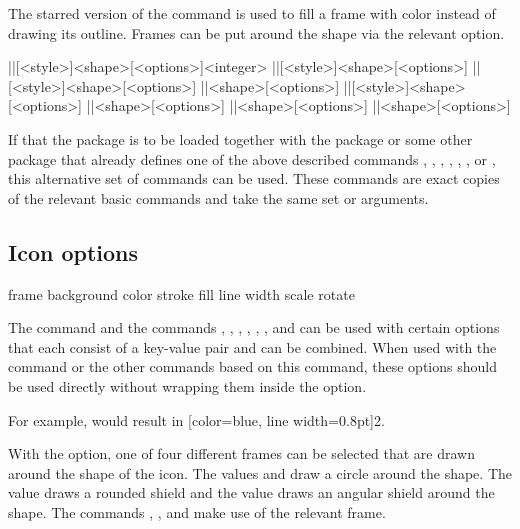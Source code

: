 \documentclass[a4paper]{article}
\begin{document}
The starred version of the command is used to fill a frame with color instead of drawing its outline. Frames can be put around the shape via the relevant  option. 

\begin{macrodef}
|\DndiconsDie|[<style>]{<shape>}[<options>]{<integer>}
|\DndiconsAbiliy|[<style>]{<shape>}[<options>]
|\DndiconsSaving|[<style>]{<shape>}[<options>]
|\DndiconsSpell|{<shape>}[<options>]
|\DndiconsSpellschool|[<style>]{<shape>}[<options>]
|\DndiconsDamage|{<shape>}[<options>]
|\DndiconsAttack|{<shape>}[<options>]
|\DndiconsCondition|{<shape>}[<options>]
\end{macrodef}
If that the  package is to be loaded together with the  package or some other package that already defines one of the above described commands \macro{\die}, \macro{\ability}, \macro{\saving}, \macro{\spell}, \macro{\spellschool}, \macro{\damage}, \macro{\attack} or \macro{\condition}, this alternative set of commands can be used. These commands are exact copies of the relevant basic commands and take the same set or arguments. 

\subsection{Icon options}

\begin{macrodef}
frame
background
color
stroke
fill
line width
scale
rotate
\end{macrodef}
The \macro{\DndIconsUseIcon} command and the commands \macro{\die}, \macro{\ability}, \macro{\saving}, \macro{\spell}, \macro{\spellschool}, \macro{\damage}, \macro{\attack} and \macro{\condition} can be used with certain options that each consist of a key-value pair and can be combined. When used with the \macro{\DndIconsUseIcon} command or the other commands based on this command, these options should be used directly without wrapping them inside the  option. 

For example,  would result in [color=blue, line width=0.8pt]{2}.

With the  option, one of four different frames can be selected that are drawn around the shape of the icon. The values  and  draw a circle around the shape. The value  draws a rounded shield and the value  draws an angular shield around the shape. The commands \macro{\ability}, \macro{\saving}, \macro{\spellschool} and \macro{\damage} make use of the relevant frame.
\end{document}
